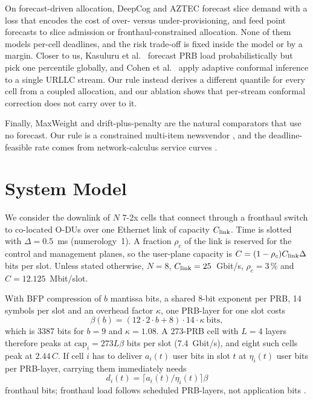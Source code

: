 \documentclass[conference]{IEEEtran}
\begin{document}
On forecast-driven allocation, DeepCog and AZTEC \cite{bega2019,bega2020} forecast slice demand with a loss that encodes the cost of over- versus under-provisioning, and \cite{sciancalepore2017,kavehmadavani2023} feed point forecasts to slice admission or fronthaul-constrained allocation. None of them models per-cell deadlines, and the risk trade-off is fixed inside the model or by a margin. Closer to us, Kasuluru et al.\ \cite{kasuluru2024} forecast PRB load probabilistically but pick one percentile globally, and Cohen et al.\ \cite{cohen2023} apply adaptive conformal inference \cite{gibbs2021} to a single URLLC stream. Our rule instead derives a different quantile for every cell from a coupled allocation, and our ablation shows that per-stream conformal correction does not carry over to it.

Finally, MaxWeight and drift-plus-penalty \cite{neely2010} are the natural comparators that use no forecast. Our rule is a constrained multi-item newsvendor \cite{hadley1963}, and the deadline-feasible rate comes from network-calculus service curves \cite{leboudec2001}.

\section{System Model}
\label{sec:model}
We consider the downlink of $N$ 7-2x cells that connect through a fronthaul switch to co-located O-DUs over one Ethernet link of capacity $C_{\rm link}$. Time is slotted with $\Delta = 0.5$~ms (numerology~1). A fraction $\rho_c$ of the link is reserved for the control and management planes, so the user-plane capacity is $C = (1-\rho_c)C_{\rm link}\Delta$ bits per slot. Unless stated otherwise, $N = 8$, $C_{\rm link} = 25$~Gbit/s, $\rho_c = 3\,\%$ and $C = 12.125$~Mbit/slot.

With BFP compression of $b$ mantissa bits, a shared 8-bit exponent per PRB, 14 symbols per slot and an overhead factor $\kappa$, one PRB-layer for one slot costs
\begin{equation}
\beta(b) = (12 \cdot 2 \cdot b + 8)\cdot 14 \cdot \kappa \ \text{bits},
\label{eq:beta}
\end{equation}
which is 3387 bits for $b = 9$ and $\kappa = 1.08$. A 273-PRB cell with $L = 4$ layers therefore peaks at $\mathrm{cap}_i = 273 L \beta$ bits per slot (7.4~Gbit/s), and eight such cells peak at $2.44\,C$. If cell $i$ has to deliver $a_i(t)$ user bits in slot $t$ at $\eta_i(t)$ user bits per PRB-layer, carrying them immediately needs
\begin{equation}
d_i(t) = \lceil a_i(t)/\eta_i(t) \rceil \beta
\label{eq:demand}
\end{equation}
fronthaul bits; fronthaul load follows scheduled PRB-layers, not application bits \cite{larsen2019}.
\end{document}
